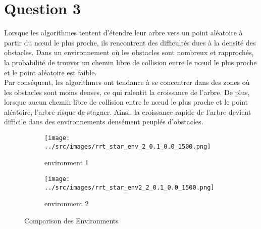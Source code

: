 \documentclass[../CSC_5RO16_TA_TP2.tex]{subfiles}
\begin{document}
\section{Question 3}
\noindent Lorsque les algorithmes tentent d'étendre leur arbre vers un point aléatoire à partir du nœud le plus proche, ils rencontrent des difficultés dues à la densité des obstacles. Dans un environnement où les obstacles sont nombreux et rapprochés, la probabilité de trouver un chemin libre de collision entre le nœud le plus proche et le point aléatoire est faible.\\

\noindent Par conséquent, les algorithmes ont tendance à se concentrer dans des zones où les obstacles sont moins denses, ce qui ralentit la croissance de l'arbre. De plus, lorsque aucun chemin libre de collision entre le nœud le plus proche et le point aléatoire, l'arbre risque de stagner. Ainsi, la croissance rapide de l'arbre devient difficile dans des environnements densément peuplés d'obstacles.
\begin{figure}[H]
    \centering
    \begin{subfigure}[b]{0.475\textwidth}
        \centering
        \texttt{[image: ../src/images/rrt\_star\_env\_2\_0.1\_0.0\_1500.png]}
        \caption{environment 1}
        \label{}
    \end{subfigure}\hfill
    \begin{subfigure}[b]{0.475\textwidth}
        \centering
        \texttt{[image: ../src/images/rrt\_star\_env2\_2\_0.1\_0.0\_1500.png]}
        \caption{environment 2}
        \label{}
    \end{subfigure}
    \caption{Comparison des Environments}
    \label{}
\end{figure}
\end{document}
